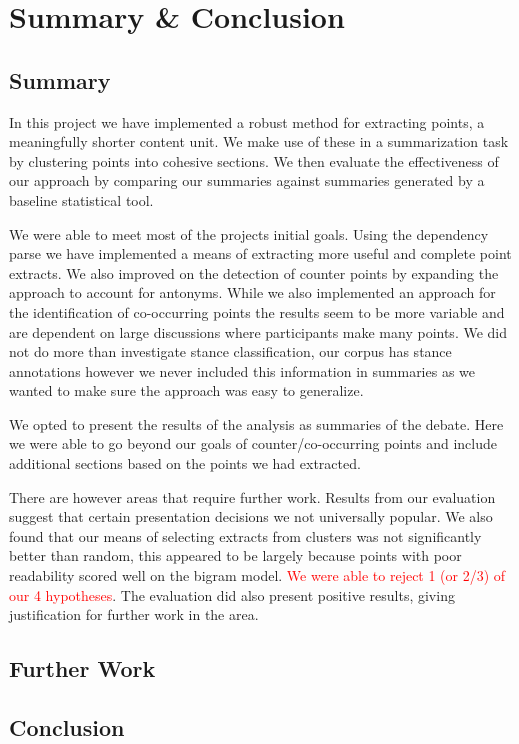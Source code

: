 \chapter{Summary \& Conclusion \label{chap:conclusion}}
  \section{Summary}
    In this project we have implemented a robust method for extracting points, a meaningfully shorter content unit. We make use of these in a summarization task by clustering points into cohesive sections. We then evaluate the effectiveness of our approach by comparing our summaries against summaries generated by a baseline statistical tool.

    We were able to meet most of the projects initial goals. Using the dependency parse we have implemented a means of extracting more useful and complete point extracts. We also improved on the detection of counter points by expanding the approach to account for antonyms. While we also implemented an approach for the identification of co-occurring points the results seem to be more variable and are dependent on large discussions where participants make many points. We did not do more than investigate stance classification, our corpus has stance annotations however we never included this information in summaries as we wanted to make sure the approach was easy to generalize.

    We opted to present the results of the analysis as summaries of the debate. Here we were able to go beyond our goals of counter/co-occurring points and include additional sections based on the points we had extracted.

    There are however areas that require further work. Results from our evaluation suggest that certain presentation decisions we not universally popular. We also found that our means of selecting extracts from clusters was not significantly better than random, this appeared to be largely because points with poor readability scored well on the bigram model. \textcolor{red}{We were able to reject 1 (or 2/3) of our 4 hypotheses}. The evaluation did also present positive results, giving justification for further work in the area.

  \section{Further Work}
  \section{Conclusion}

